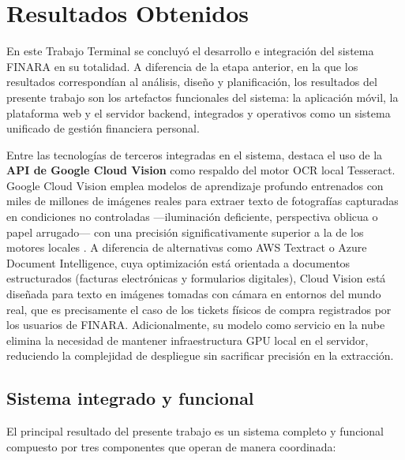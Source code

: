 \chapter{Resultados Obtenidos}

En este Trabajo Terminal se concluyó el desarrollo e integración del sistema FINARA en su totalidad. A diferencia de la etapa anterior, en la que los resultados correspondían al análisis, diseño y planificación, los resultados del presente trabajo son los artefactos funcionales del sistema: la aplicación móvil, la plataforma web y el servidor backend, integrados y operativos como un sistema unificado de gestión financiera personal.

Entre las tecnologías de terceros integradas en el sistema, destaca el uso de la \textbf{API de Google Cloud Vision} como respaldo del motor OCR local Tesseract. Google Cloud Vision emplea modelos de aprendizaje profundo entrenados con miles de millones de imágenes reales para extraer texto de fotografías capturadas en condiciones no controladas ---iluminación deficiente, perspectiva oblicua o papel arrugado--- con una precisión significativamente superior a la de los motores locales \cite{GoogleCloudVisionAPI}. A diferencia de alternativas como AWS Textract o Azure Document Intelligence, cuya optimización está orientada a documentos estructurados (facturas electrónicas y formularios digitales), Cloud Vision está diseñada para texto en imágenes tomadas con cámara en entornos del mundo real, que es precisamente el caso de los tickets físicos de compra registrados por los usuarios de FINARA. Adicionalmente, su modelo como servicio en la nube elimina la necesidad de mantener infraestructura GPU local en el servidor, reduciendo la complejidad de despliegue sin sacrificar precisión en la extracción.

\section{Sistema integrado y funcional}

El principal resultado del presente trabajo es un sistema completo y funcional compuesto por tres componentes que operan de manera coordinada:

